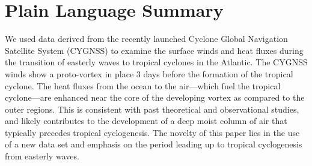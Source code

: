 \documentclass[draft]{agujournal2019}
\begin{document}
\section*{Plain Language Summary}
We used data derived from the recently launched Cyclone Global Navigation Satellite System (CYGNSS) to examine the surface winds and heat fluxes during the transition of easterly waves to tropical cyclones in the Atlantic. The CYGNSS winds show a proto-vortex in place 3 days before the formation of the tropical cyclone. The heat fluxes from the ocean to the air---which fuel the tropical cyclone---are enhanced near the core of the developing vortex as compared to the outer regions. This is consistent with past theoretical and observational studies, and likely contributes to the development of a deep moist column of air that typically precedes tropical cyclogenesis. The novelty of this paper lies in the use of a new data set and emphasis on the period leading up to tropical cyclogenesis from easterly waves.



%
%

%


%
%
%
%
\end{document}
